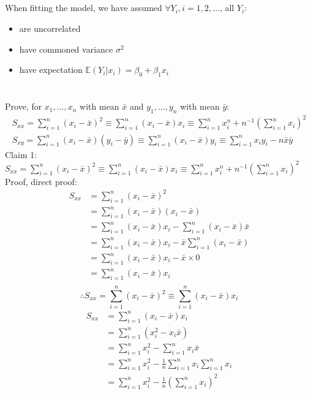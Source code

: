 \documentclass[a4paper]{article}
\begin{document}
	\subsection*{}
		When fitting the model, we have assumed \(\forall Y_i, i = 1,2,...\), all \(Y_i\):
			\begin{itemize}
				\item are uncorrelated
				\item have commoned variance \(\sigma^2\)
				\item have expectation \(\mathbb{E}(Y_i|x_i) = \beta_0 + \beta_1x_i\)
			\end{itemize}

\newpage
\section{}
	Prove, for \(x_1, ..., x_n\) with mean \(\bar{x}\) and \(y_1, ..., y_n\) with mean \(\bar{y}\):
	\[
		\begin{split}
			S_{xx} = \sum_{i=1}^n(x_i-\bar{x})^2 \equiv \sum_{i=1}^n(x_i-\bar{x})x_i \equiv \sum_{i=1}^nx_i^n + n^{-1}\left(\sum_{i=1}^nx_i\right)^2\\
			S_{xy} = \sum_{i=1}^n(x_i-\bar{x})(y_i-\bar{y}) \equiv \sum_{i=1}^n (x_i - \bar{x})y_i \equiv \sum_{i=1}^nx_iy_i - n\bar{x}\bar{y}
		\end{split}
	\]
		Claim 1: \(S_{xx} = \sum_{i=1}^n(x_i-\bar{x})^2 \equiv \sum_{i=1}^n(x_i-\bar{x})x_i \equiv \sum_{i=1}^nx_i^n + n^{-1}\left(\sum_{i=1}^nx_i\right)^2\)\\
		Proof, direct proof:
			\begin{equation*}
				\begin{split}
					S_{xx} &= \sum_{i=1}^n(x_i-\bar{x})^2\\
					&= \sum_{i=1}^n(x_i-\bar{x})(x_i-\bar{x})\\
					&= \sum_{i=1}^n(x_i-\bar{x})x_i - \sum_{i=1}^n(x_i-\bar{x})\bar{x}\\
					&= \sum_{i=1}^n(x_i-\bar{x})x_i - \bar{x}\sum_{i=1}^n(x_i-\bar{x})\\
					&= \sum_{i=1}^n(x_i-\bar{x})x_i - \bar{x}\times 0\\
					&= \sum_{i=1}^n(x_i-\bar{x})x_i\\
				\end{split}
			\end{equation*}
			\[\therefore S_{xx} = \sum_{i=1}^n(x_i-\bar{x})^2 \equiv \sum_{i=1}^n(x_i-\bar{x})x_i\]
			\begin{equation*}
				\begin{split}
					S_{xx} &= \sum_{i=1}^n(x_i-\bar{x})x_i\\
					&= \sum_{i=1}^n \left(x_i^2 - x_i\bar{x}\right)\\
					&= \sum_{i=1}^n x_i^2 - \sum_{i=1}^nx_i\bar{x}\\
					&= \sum_{i=1}^n x_i^2 - \frac{1}{n}\sum_{i=1}^nx_i\sum_{i=1}^nx_i\\
					&= \sum_{i=1}^n x_i^2 - \frac{1}{n}\left(\sum_{i=1}^nx_i\right)^2
				\end{split}
			\end{equation*}
\end{document}
